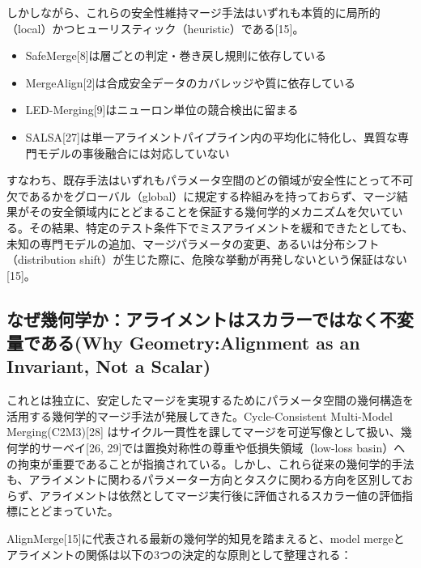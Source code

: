 \documentclass{article}
\begin{document}
しかしながら、これらの安全性維持マージ手法はいずれも本質的に局所的（local）かつヒューリスティック（heuristic）である[15]。
\begin{itemize}
\item SafeMerge[8]は層ごとの判定・巻き戻し規則に依存している
\item MergeAlign[2]は合成安全データのカバレッジや質に依存している
\item LED-Merging[9]はニューロン単位の競合検出に留まる
\item SALSA[27]は単一アライメントパイプライン内の平均化に特化し、異質な専門モデルの事後融合には対応していない
\end{itemize}

すなわち、既存手法はいずれもパラメータ空間のどの領域が安全性にとって不可欠であるかをグローバル（global）に規定する枠組みを持っておらず、マージ結果がその安全領域内にとどまることを保証する幾何学的メカニズムを欠いている。その結果、特定のテスト条件下でミスアライメントを緩和できたとしても、未知の専門モデルの追加、マージパラメータの変更、あるいは分布シフト（distribution shift）が生じた際に、危険な挙動が再発しないという保証はない[15]。

\subsection{なぜ幾何学か：アライメントはスカラーではなく不変量である(Why Geometry:Alignment as an Invariant, Not a Scalar)}

これとは独立に、安定したマージを実現するためにパラメータ空間の幾何構造を活用する幾何学的マージ手法が発展してきた。Cycle-Consistent Multi-Model Merging(C2M3)[28] はサイクル一貫性を課してマージを可逆写像として扱い、幾何学的サーベイ[26, 29]では置換対称性の尊重や低損失領域（low-loss basin）への拘束が重要であることが指摘されている。しかし、これら従来の幾何学的手法も、アライメントに関わるパラメーター方向とタスクに関わる方向を区別しておらず、アライメントは依然としてマージ実行後に評価されるスカラー値の評価指標にとどまっていた。

AlignMerge[15]に代表される最新の幾何学的知見を踏まえると、model mergeとアライメントの関係は以下の3つの決定的な原則として整理される：
\end{document}
